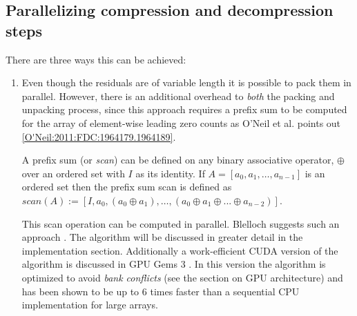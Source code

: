 \subsection{Parallelizing compression and decompression steps}
There are three ways this can be achieved: 
\begin{enumerate}
 \item Even though the residuals are of variable length it is possible to pack them in parallel. However, there is an additional overhead to \textit{both} the packing and 
 unpacking process, since this approach requires a prefix sum to be computed for the array of element-wise leading zero counts as O'Neil et al. points out 
 \ref{O'Neil:2011:FDC:1964179.1964189}.
 
 A prefix sum (or \textit{scan}) can be defined on any binary associative operator, $\oplus$ over an ordered set with $I$ as its identity. If $A=[a_{0},a_{1},\dots,a_{n-1}]$ 
 is an ordered set then the prefix sum scan is defined as $scan(A):=[I,a_{0},(a_{0} \oplus a_{1}),\dots,(a_{0} \oplus a_{1} \oplus ... \oplus a_{n-2})]$.

 This scan operation can be computed in parallel. Blelloch suggests such an approach \cite{blelloch1990prefix}. The algorithm will be discussed in greater detail in the 
 implementation section. Additionally a work-efficient CUDA version of the algorithm is discussed in GPU Gems 3 \cite{harris2007parallel}. In this version the algorithm is 
 optimized to avoid \textit{bank conflicts} (see the section on GPU architecture) and has been shown to be up to 6 times faster than a sequential CPU implementation for large 
 arrays.
 

\end{enumerate}
